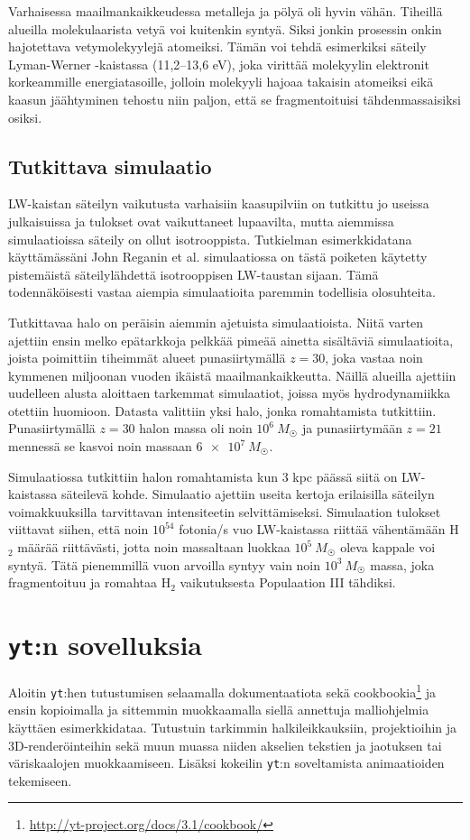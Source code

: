 \documentclass[12pt,a4paper]{article}
\newcommand{\yt}{\texttt{yt}}
\begin{document}
Varhaisessa maailmankaikkeudessa metalleja ja pölyä oli hyvin vähän. Tiheillä alueilla molekulaarista vetyä voi kuitenkin syntyä. Siksi jonkin prosessin onkin hajotettava vetymolekyylejä atomeiksi. Tämän voi tehdä esimerkiksi säteily Lyman-Werner -kaistassa (11,2--13,6 eV), joka virittää molekyylin elektronit korkeammille energiatasoille, jolloin molekyyli hajoaa takaisin atomeiksi eikä kaasun jäähtyminen tehostu niin paljon, että se fragmentoituisi tähdenmassaisiksi osiksi. \cite{rj}

\subsection{Tutkittava simulaatio}
LW-kaistan säteilyn vaikutusta varhaisiin kaasupilviin on tutkittu jo useissa julkaisuissa ja tulokset ovat vaikuttaneet lupaavilta, mutta aiemmissa simulaatioissa säteily on ollut isotrooppista. Tutkielman esimerkkidatana käyttämässäni John Reganin et al. simulaatiossa on tästä poiketen käytetty pistemäistä säteilylähdettä isotrooppisen LW-taustan sijaan. Tämä todennäköisesti vastaa aiempia simulaatioita paremmin todellisia olosuhteita. \cite{rj}

Tutkittavaa halo on peräisin aiemmin ajetuista simulaatioista. Niitä varten ajettiin ensin melko epätarkkoja pelkkää pimeää ainetta sisältäviä simulaatioita, joista poimittiin tiheimmät alueet punasiirtymällä $z=30$, joka vastaa noin kymmenen miljoonan vuoden ikäistä maailmankaikkeutta. Näillä alueilla ajettiin uudelleen alusta aloittaen tarkemmat simulaatiot, joissa myös hydrodynamiikka otettiin huomioon. Datasta valittiin yksi halo, jonka romahtamista tutkittiin. Punasiirtymällä $z = 30$ halon massa oli noin $10^6~M_{\astrosun}$ ja punasiirtymään $z = 21$ mennessä se kasvoi noin massaan $\SI{6e7}{} M_{\astrosun}$. \cite{rj}

Simulaatiossa tutkittiin halon romahtamista kun 3 kpc päässä siitä on LW-kaistassa säteilevä kohde. Simulaatio ajettiin useita kertoja erilaisilla säteilyn voimakkuuksilla tarvittavan intensiteetin selvittämiseksi. Simulaation tulokset viittavat siihen, että noin $10^{54}$ fotonia/s vuo LW-kaistassa riittää vähentämään H$_2$ määrää riittävästi, jotta noin massaltaan luokkaa $10^5~M_{\astrosun}$ oleva kappale voi syntyä. Tätä pienemmillä vuon arvoilla syntyy vain noin $10^3~M_{\astrosun}$ massa, joka fragmentoituu ja romahtaa H$_2$ vaikutuksesta Populaation III tähdiksi. \cite{rj}

\section{\yt :n sovelluksia}
Aloitin \yt :hen tutustumisen selaamalla dokumentaatiota sekä cookbookia\footnote{\url{http://yt-project.org/docs/3.1/cookbook/}} ja ensin kopioimalla ja sittemmin muokkaamalla siellä annettuja malliohjelmia käyttäen esimerkkidataa. Tutustuin tarkimmin halkileikkauksiin, projektioihin ja 3D-renderöinteihin sekä muun muassa niiden akselien tekstien ja jaotuksen tai väriskaalojen muokkaamiseen. Lisäksi kokeilin \yt :n soveltamista animaatioiden tekemiseen.
\end{document}
